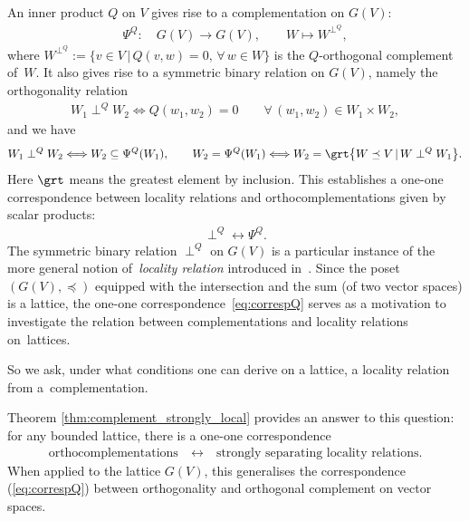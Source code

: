 \documentclass[10pt,a4paper]{amsart}
\numberwithin{equation}{section}
\newcommand{\loc}{locality\xspace}
\newcommand{\pone}{separating\xspace }
\begin{document}
 An inner product $Q$ on $V$ gives rise to a
complementation on $G(V)$:
\begin{gather*}
\Psi^Q\colon\quad	G(V)\longrightarrow G(V),\qquad
	W \longmapsto	 W^{\perp^Q},
\end{gather*}
 where $W^{\perp^Q}:=\{v\in V\,|\, Q(v, w)=0,\, \forall\, w\in W\}$ is the $Q$-orthogonal complement of~$W$. It also gives rise to a symmetric binary relation on $G(V)$, namely the orthogonality relation
\begin{gather}
\label{eq:introQW}
W_1\perp^Q W_2\Longleftrightarrow Q(w_1, w_2)=0\qquad
\forall\, (w_1, w_2)\in W_1\times W_2,
\end{gather}
and we have
\begin{gather*}
W_1\perp^Q W_2\Longleftrightarrow W_2\subseteq \Psi^Q(W_1),\qquad
W_2=\Psi^Q(W_1)\Longleftrightarrow W_2=\grt \big\{ W \preceq V\,|\, W\perp^QW_1\big\}.
\end{gather*}
Here $\grt $ means the greatest element by inclusion. This establishes a one-one correspondence between locality relations and orthocomplementations given by scalar products:
\begin{gather}\label{eq:correspQ}
\perp^Q\longleftrightarrow \Psi^Q.
\end{gather}
The symmetric binary relation $\perp^Q$ on $G(V)$ is a particular instance of the more general notion of~{\it locality relation} introduced in~\cite{CGPZ1}. Since the poset $(G(V), \preceq)$ equipped with the intersection and the sum (of two vector spaces) is a lattice, the one-one correspondence~\eqref{eq:correspQ} serves as a motivation to investigate the relation between complementations and \loc relations on~lattices.

So we ask, under what conditions one can derive on a lattice, a \loc relation from a~com\-p\-le\-men\-tation.

Theorem \ref {thm:complement_strongly_local} provides an answer to this question:
for any bounded lattice, there is a one-one correspondence
\begin{gather}\label{eq:corresp}
\text{orthocomplementations} \quad \longleftrightarrow\quad \text{strongly \pone \loc relations.} \end{gather}
When applied to
	the lattice $G(V)$, this generalises the correspondence (\ref{eq:correspQ}) between orthogonality and orthogonal complement on vector spaces.
	
\end{document}
